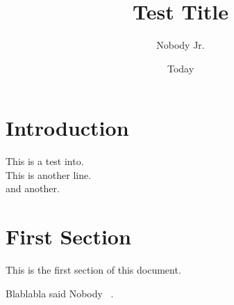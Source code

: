 \documentclass[8pt,letterpaper]{article}
\begin{document}
\title{Test Title}
\author{Nobody Jr.}
\date{Today}
\maketitle

\section{Introduction}
This is a test into.\\
This is another line.\\
and another.

\section{First Section}
This is the first section of this document.

Blablabla said Nobody ~\cite{Nobody06}.

{}

\end{document}

